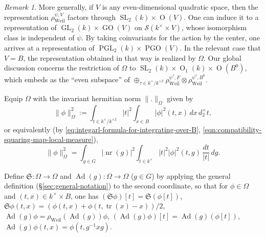 \documentclass[reqno,10pt]{amsart}
\theoremstyle{plain} %
\theoremstyle{definition}
\theoremstyle{plain} %
\theoremstyle{remark}
\newtheorem*{remark*}            {Remark}
\theoremstyle{itplain} %
\theoremstyle{remark} %
\numberwithin{equation}{section}
\DeclareMathOperator{\SL}{SL}
\DeclareMathOperator{\GL}{GL}
\DeclareMathOperator{\GO}{GO}
\DeclareMathOperator{\PGO}{PGO}
\DeclareMathOperator{\Ad}{Ad}
\def\PGL{\operatorname{PGL}}
\DeclareMathOperator{\Weil}{Weil}
\def\O{\operatorname{O}}
\DeclareMathOperator{\nr}{nr}
\DeclareMathOperator{\tr}{tr}
\begin{document}
\begin{remark*}
  More generally, if $V$ is any even-dimensional quadratic space, then the representation $\rho_{\Weil}^{\psi,V}$ factors through $\SL_2(k) \times \O(V)$.  One can induce it to a representation of $\GL_2(k) \times \GO(V)$ on $\mathcal{S}(k^\times \times V)$, whose isomorphism class is independent of $\psi$.  By taking coinvariants for the action by the center, one arrives at a representation of $\PGL_2(k) \times \PGO(V)$.  In the relevant case that $V = B$, the representation obtained in that way is realized by $\Omega$.  Our global discussion concerns the restriction of $\Omega$ to $\SL_2(k) \times \O_1(k) \times \O(B^0)$, which embeds as the ``even subspace'' of $\oplus_{\tau \in k^{\times} / k^{\times 2}} \rho_{\Weil}^{\psi^{\tau},F} \otimes \rho_{\Weil}^{\psi^{\tau},B^0}$.
\end{remark*}




Equip $\Omega$ with the invariant hermitian norm $\|.\|_{\Omega}$ given by
\begin{equation}\label{eqn:inner-product-on-Omega-1}
  \|\phi\|^2_{\Omega}
  :=
  \int_{t \in k^\times / k^{\times 2}}
  |t|^2
  \int_{x \in B}
  |\phi|^2(t,x) \, d x
  \, d _2 ^\times t,
\end{equation}
or equivalently (by \eqref{eq:integarl-formula-for-integrating-over-B}, \eqref{eqn:compatibility-squaring-map-local-measure}),
\begin{equation}\label{eqn:inner-product-on-Omega-2}
  \|\phi\|^2_{\Omega}
  = 
  \int_{g \in G}
  |\nr(g)|^2
  \int_{t \in k^\times}
  |t|^2
  |\phi|^2(t,g)
  \, \frac{d t}{|t|} \, d g.
\end{equation}


Define $\mathfrak{S} : \Omega \rightarrow \Omega$ and $\Ad(g) : \Omega \rightarrow \Omega$ ($g \in G$) by applying the general definition (\S\ref{sec:general-notation}) to the second coordinate, so that for $\phi \in \Omega$ and $(t,x) \in k^\times \times B$, one has $(\mathfrak{S} \phi)[t] = \mathfrak{S} (\phi[t])$, $\mathfrak{S} \phi(t,x) = (\phi(t,x) + \phi(t,\tr(x)- x))/2$, $\Ad(g) \phi = \rho_{\Weil}(\Ad(g)) \phi$, $(\Ad(g) \phi)[t] = \Ad(g) (\phi[t])$, $\Ad(g) \phi(t,x) = \phi(t,g^{-1} x g)$.
\end{document}
